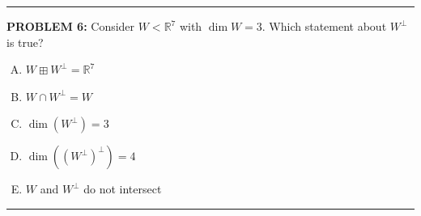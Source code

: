 \documentclass[12pt]{amsart}
\newcommand{\divider}{
  \vspace{-1em} %
  \noindent
  \raisebox{-0.15ex}{\textbullet}%
  \hspace{0.5em}%
  \rule[0.5ex]{0.95\textwidth}{1.0pt}%
  \hspace{0.5em}%
  \raisebox{-0.15ex}{\textbullet}%
  \vspace{0em} %
}
\begin{document}
%
\divider

{\bf PROBLEM 6:}
%
Consider $W<\mathbb{R}^7$ with $\dim W=3$. Which statement about $W^\perp$ is true?

\begin{enumerate}[(A)]
\item $W \boxplus W^\perp = \mathbb{R}^7$
\item $W \cap W^\perp = W$
\item $\dim(W^\perp) = 3$
\item $\dim\left((W^\perp)^\perp\right)=4$
\item $W$ and $W^\perp$ do not intersect
\end{enumerate}

\divider 
\end{document}
